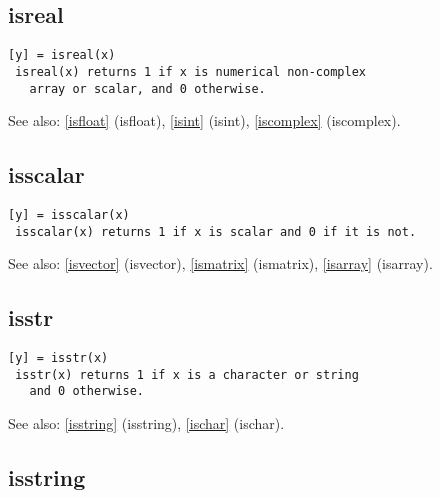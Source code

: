 \documentclass[a4paper]{article}
\begin{document}
\subsection{isreal\label{isreal}}

\begin{tscreen}
\begin{verbatim}
[y] = isreal(x)
 isreal(x) returns 1 if x is numerical non-complex
   array or scalar, and 0 otherwise.
\end{verbatim}

See also: \ref{isfloat} {(isfloat)}, \ref{isint} {(isint)}, \ref{iscomplex} {(iscomplex)}.
\end{tscreen}





\subsection{isscalar\label{isscalar}}

\begin{tscreen}
\begin{verbatim}
[y] = isscalar(x)
 isscalar(x) returns 1 if x is scalar and 0 if it is not.
\end{verbatim}

See also: \ref{isvector} {(isvector)}, \ref{ismatrix} {(ismatrix)}, \ref{isarray} {(isarray)}.
\end{tscreen}





\subsection{isstr\label{isstr}}

\begin{tscreen}
\begin{verbatim}
[y] = isstr(x)
 isstr(x) returns 1 if x is a character or string
   and 0 otherwise.
\end{verbatim}

See also: \ref{isstring} {(isstring)}, \ref{ischar} {(ischar)}.
\end{tscreen}





\subsection{isstring\label{isstring}}
\end{document}
